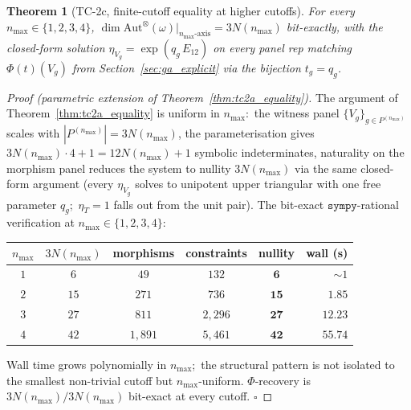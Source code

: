 \documentclass[11pt,a4paper]{article}
\theoremstyle{plain}
\newtheorem{theorem}{Theorem}[section]
\theoremstyle{definition}
\newcommand{\nmax}{n_{\max}}
\newcommand{\Aut}{\mathrm{Aut}}
\newcommand{\sympy}{\texttt{sympy}}
\newcommand{\Phimap}{\Phi}
\newcommand{\fibfun}{\omega}
\begin{document}
\begin{theorem}[TC-2c, finite-cutoff equality at higher cutoffs]\label{thm:tc2c_higher_cutoff}
For every $\nmax \in \{1, 2, 3, 4\}$,
$\dim \Aut^{\otimes}(\fibfun)\big|_{\nmax\text{-axis}} = 3 N(\nmax)$
bit-exactly, with the closed-form solution
$\eta_{V_{g}} = \exp(q_{g}\, E_{12})$ on every panel rep matching
$\Phimap(t)(V_{g})$ from Section~\ref{sec:ga_explicit} via the
bijection $t_{g} = q_{g}$.
\end{theorem}

\begin{proof}[Proof (parametric extension of Theorem~\ref{thm:tc2a_equality})]
The argument of Theorem~\ref{thm:tc2a_equality} is uniform in
$\nmax$:\ the witness panel $\{V_{g}\}_{g \in P^{(\nmax)}}$ scales
with $|P^{(\nmax)}| = 3 N(\nmax)$, the parameterisation gives
$3 N(\nmax) \cdot 4 + 1 = 12 N(\nmax) + 1$ symbolic indeterminates,
naturality on the morphism panel reduces the system to nullity
$3 N(\nmax)$ via the same closed-form argument
(every $\eta_{V_{g}}$ solves to unipotent upper triangular with one
free parameter $q_{g}$;\ $\eta_{T} = 1$ falls out from the unit
pair). The bit-exact $\sympy$-rational verification at
$\nmax \in \{1, 2, 3, 4\}$:
\begin{center}
\begin{tabular}{c c c c c r}
\toprule
$\nmax$ & $3 N(\nmax)$ & morphisms & constraints & nullity & wall (s) \\
\midrule
$1$ & $6$ & $49$ & $132$ & $\mathbf{6}$ & $\sim 1$ \\
$2$ & $15$ & $271$ & $736$ & $\mathbf{15}$ & $1.85$ \\
$3$ & $27$ & $811$ & $2{,}296$ & $\mathbf{27}$ & $12.23$ \\
$4$ & $42$ & $1{,}891$ & $5{,}461$ & $\mathbf{42}$ & $55.74$ \\
\bottomrule
\end{tabular}
\end{center}
Wall time grows polynomially in $\nmax$;\ the structural pattern is
not isolated to the smallest non-trivial cutoff but
$\nmax$-uniform. $\Phi$-recovery is $3 N(\nmax) / 3 N(\nmax)$
bit-exact at every cutoff. $\square$
\end{proof}
\end{document}
